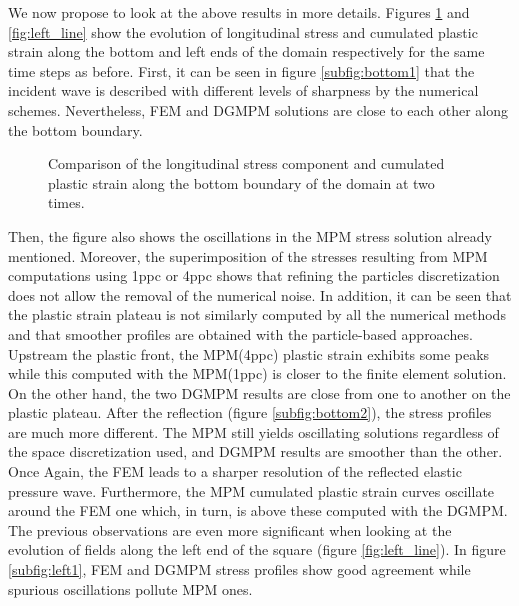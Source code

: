 We now propose to look at the above results in more details.
Figures \ref{fig:bottom_line} and \ref{fig:left_line} show the evolution of longitudinal stress and cumulated plastic strain along the bottom and left ends of the domain respectively for the same time steps as before.
First, it can be seen in figure \ref{subfig:bottom1} that the incident wave is described with different levels of sharpness by the numerical schemes.
Nevertheless, FEM and DGMPM solutions are close to each other along the bottom boundary.
\begin{figure}[h!]
  \centering
  {}
  {}
  
  \caption{Comparison of the longitudinal stress component and cumulated plastic strain along the bottom boundary of the domain at two times.}
  \label{fig:bottom_line}
\end{figure}
Then, the figure also shows the oscillations in the MPM stress solution already mentioned.
Moreover, the superimposition of the stresses resulting from MPM computations using 1ppc or 4ppc shows that refining the particles discretization does not allow the removal of the numerical noise.
In addition, it can be seen that the plastic strain plateau is not similarly computed by all the numerical methods and that smoother profiles are obtained with the particle-based approaches. 
Upstream the plastic front, the MPM(4ppc) plastic strain exhibits some peaks while this computed with the MPM(1ppc) is closer to the finite element solution.
On the other hand, the two DGMPM results are close from one to another on the plastic plateau.
%
After the reflection (figure \ref{subfig:bottom2}), the stress profiles are much more different. 
The MPM still yields oscillating solutions regardless of the space discretization used, and DGMPM results are smoother than the other.
Once Again, the FEM leads to a sharper resolution of the reflected elastic pressure wave.
Furthermore, the MPM cumulated plastic strain curves oscillate around the FEM one which, in turn, is above these computed with the DGMPM.
%
The previous observations are even more significant when looking at the evolution of fields along the left end of the square (figure \ref{fig:left_line}).
In figure \ref{subfig:left1}, FEM and DGMPM stress profiles show good agreement while spurious oscillations pollute MPM ones. 
